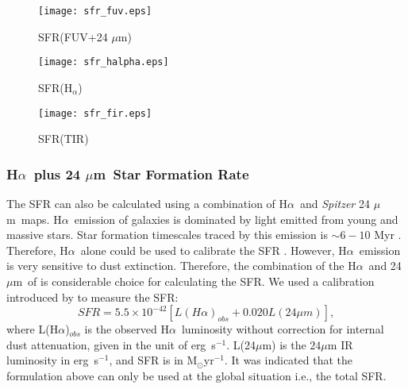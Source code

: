 \documentclass[useAMS,usenatbib]{mn2e}
\newcommand \halpha    {H$\alpha $\ }
\newcommand \um    {$\mu$m\ }
\newcommand \Spitzer {{\it Spitzer }}
\begin{document}

\begin{figure*}
    \centering
    \begin{subfigure}[b]{1\textwidth}
        \centering
        \texttt{[image: sfr\_fuv.eps]}
        \caption{SFR(FUV+24 $\mu$m)}
        \label{fig:sfr,fuv}
    \end{subfigure}
    \hfill
    \begin{subfigure}[b]{1\textwidth}
        \centering
        \texttt{[image: sfr\_halpha.eps]}
        \caption{SFR(H$_{\alpha}$)}
        \label{fig:sfr_halpha}
    \end{subfigure}
    \hfill
    \begin{subfigure}[b]{1\textwidth}
        \centering
        \texttt{[image: sfr\_fir.eps]}
        \caption{SFR(TIR)}
        \label{fig:sfr,fir}
    \end{subfigure}
    \caption{SFR map from a combination of FUV + 24 $\mu$m emission (top), \halpha and 24 $\mu$m emission (middle), and total infrared emission (bottom). All the SFR maps here, have the angular resolution of the 18\arcsec and pixel size of 9.85\arcsec, same as MIPS 70 $\mu$m map; highest angular resolution among the components of the SFR}
    \label{fig:sfrs}
\end{figure*}

\subsubsection{\halpha plus 24 \um Star Formation Rate}
\label{sec:sfr_halpha}

The SFR can also be calculated using a combination of \halpha and \Spitzer  24 \um maps. \halpha emission of galaxies is dominated by light emitted from young and massive stars. Star formation timescales traced by this emission is $\sim 6-10$ Myr \citep[e.g.][]{Kennicutt09, Calzetti13}. Therefore, \halpha alone could be used to calibrate the SFR \citep[e.g.][]{Osterbrock06, Kennicutt09}. However, \halpha emission is very sensitive to dust extinction. Therefore, the combination of the \halpha and 24\um of is considerable choice for calculating the SFR. We used a calibration introduced by \cite{Kennicutt09} to measure the SFR:
\begin{equation}
\label{equ: halphaplus24_g}
SFR = 5.5 \times 10^{-42}[L(H{\alpha})_{obs} + 0.020L(24\mu m)],
\end{equation}
\noindent where L(H${\alpha}$)$_{obs}$ is the observed \halpha luminosity without correction for internal dust attenuation, given in the unit of erg~s$^{-1}$. L(24$\mu$m) is the $24\mu$m IR luminosity in erg~s$^{-1}$, and SFR is in M$_{\odot}$yr$^{-1}$. It was indicated that the formulation above can only be used at the global situation i.e., the total SFR.
\end{document}
